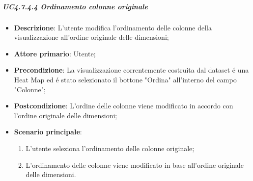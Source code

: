 \subparagraph{UC4.7.4.4 Ordinamento colonne originale}
\label{spar:uc4.7.4.4}
\begin{itemize}
    \item \textbf{Descrizione}:     L'utente modifica l'ordinamento delle colonne della visualizzazione all'ordine originale delle dimensioni;
    \item \textbf{Attore primario}: Utente;
    \item \textbf{Precondizione}:   La visualizzazione correntemente costruita dal dataset é una Heat Map ed é stato selezionato il bottone "Ordina" all'interno del campo "Colonne";
    \item \textbf{Postcondizione}:  L'ordine delle colonne viene modificato in accordo con l'ordine originale delle dimensioni;
    \item \textbf{Scenario principale}:
    \begin{enumerate}
        \item L'utente seleziona l'ordinamento delle colonne originale;
        \item L'ordinamento delle colonne viene modificato in base all'ordine originale delle dimensioni.
    \end{enumerate}
\end{itemize}

